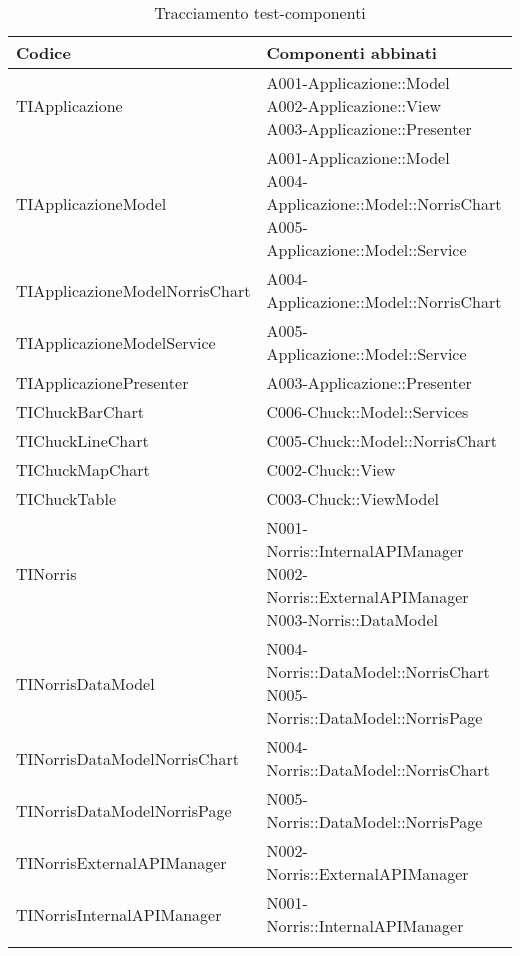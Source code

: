 
				\begin{longtabu} spread 1cm [c]{|p{5cm}|p{9cm}|}
					\hline
					\rowfont{\bf \centering}
					Codice &
					Componenti abbinati \\
					\hline
					\endhead
					
					TIApplicazione & \parbox[t]{4cm}{ A001-Applicazione::Model \\ A002-Applicazione::View \\ A003-Applicazione::Presenter }\\
                \hline
                TIApplicazioneModel & \parbox[t]{4cm}{ A001-Applicazione::Model \\ A004-Applicazione::Model::NorrisChart \\ A005-Applicazione::Model::Service }\\
                \hline
                TIApplicazioneModelNorrisChart & \parbox[t]{4cm}{ A004-Applicazione::Model::NorrisChart }\\
                \hline
                TIApplicazioneModelService & \parbox[t]{4cm}{ A005-Applicazione::Model::Service }\\
                \hline
                TIApplicazionePresenter & \parbox[t]{4cm}{ A003-Applicazione::Presenter }\\
                \hline
                TIChuckBarChart & \parbox[t]{4cm}{ C006-Chuck::Model::Services }\\
                \hline
                TIChuckLineChart & \parbox[t]{4cm}{ C005-Chuck::Model::NorrisChart }\\
                \hline
                TIChuckMapChart & \parbox[t]{4cm}{ C002-Chuck::View }\\
                \hline
                TIChuckTable & \parbox[t]{4cm}{ C003-Chuck::ViewModel }\\
                \hline
                TINorris & \parbox[t]{4cm}{ N001-Norris::InternalAPIManager \\ N002-Norris::ExternalAPIManager \\ N003-Norris::DataModel }\\
                \hline
                TINorrisDataModel & \parbox[t]{4cm}{ N004-Norris::DataModel::NorrisChart \\ N005-Norris::DataModel::NorrisPage }\\
                \hline
                TINorrisDataModelNorrisChart & \parbox[t]{4cm}{ N004-Norris::DataModel::NorrisChart }\\
                \hline
                TINorrisDataModelNorrisPage & \parbox[t]{4cm}{ N005-Norris::DataModel::NorrisPage }\\
                \hline
                TINorrisExternalAPIManager & \parbox[t]{4cm}{ N002-Norris::ExternalAPIManager }\\
                \hline
                TINorrisInternalAPIManager & \parbox[t]{4cm}{ N001-Norris::InternalAPIManager }\\
                \hline
                                \caption{Tracciamento test-componenti}
				\end{longtabu}
				